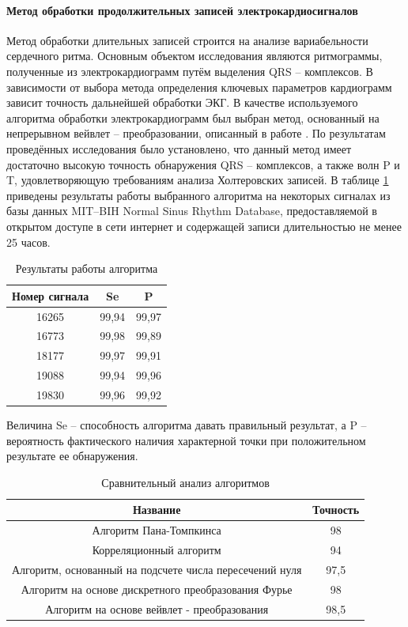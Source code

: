 \documentclass[a4paper,12pt]{article}         %
\begin{document}
\paragraph{Метод обработки продолжительных записей электрокардиосигналов} 
Метод обработки длительных записей строится на анализе вариабельности сердечного ритма. Основным объектом исследования являются ритмограммы, полученные из электрокардиограмм путём выделения QRS – комплексов. В зависимости от выбора метода определения ключевых параметров кардиограмм зависит точность дальнейшей обработки ЭКГ. В качестве используемого алгоритма обработки электрокардиограмм был выбран метод, основанный на непрерывном вейвлет – преобразовании, описанный в работе \cite{bolanos2006comparison} . 
По результатам проведённых исследования было установлено, что данный метод имеет достаточно высокую точность обнаружения QRS – комплексов, а также волн P и T, удовлетворяющую требованиям анализа Холтеровских записей. В таблице \ref{tabular:t1}  приведены результаты работы выбранного алгоритма на некоторых сигналах из базы данных MIT–BIH Normal Sinus Rhythm Database, предоставляемой в открытом доступе в сети интернет и содержащей записи длительностью не менее 25 часов.

\begin{table}[t]
\caption{\label{tabular:t1}Результаты работы алгоритма}
\begin{center}
	\begin{tabular}{|c|c|c|}
		\hline
		Номер сигнала & Se & P \\
		\hline
		16265 & 99,94  & 99,97\\
		16773 & 99,98  & 99,89 \\
		18177 & 99,97  & 99,91 \\
		19088 & 99,94  & 99,96 \\
		19830 & 99,96  & 99,92 \\
		\hline
		
	\end{tabular}
\end{center}
\end{table} 
Величина Se – способность алгоритма давать правильный результат, а P – вероятность фактического наличия характерной точки при положительном результате ее обнаружения.


\begin{table}[h]

	\caption{Сравнительный анализ алгоритмов}
	\label{tabular:t2}
	\begin{center}
		\begin{tabular}{|c|c|}
			\hline
			Название & Точность \\
			\hline
			Алгоритм Пана-Томпкинса & 98\\
			Корреляционный алгоритм & 94\\
			Алгоритм, основанный на подсчете числа пересечений нуля & 97,5\\
			Алгоритм на основе дискретного преобразования Фурье & 98\\
			Алгоритм на основе вейвлет - преобразования & 98,5\\
			\hline
		\end{tabular}
	\end{center}
\end{table}
\end{document}
